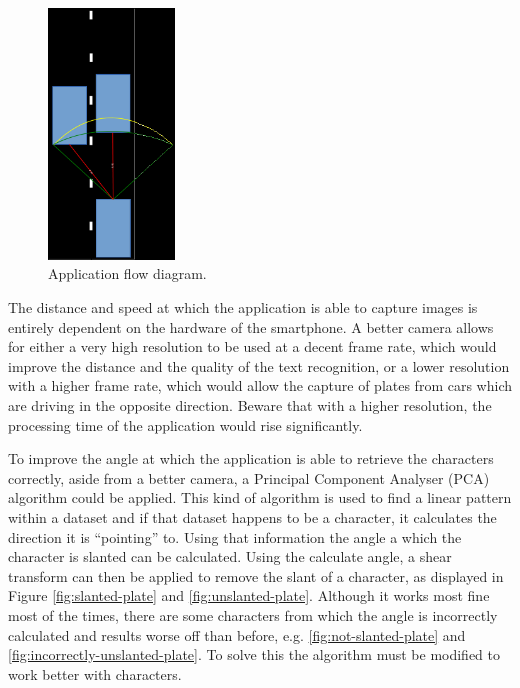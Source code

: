 \begin{figure}[ht]
    \centering
    \includegraphics[width=0.3\textwidth]{plaatjes/roadeye-road}
    \caption{Application flow diagram.}
    \label{fig:road-situation}
\end{figure}%




The distance and speed at which the application is able to capture images is entirely dependent on the hardware of the smartphone. A better camera allows for either a very high resolution to be used at a decent frame rate, which would improve the distance and the quality of the text recognition, or a lower resolution with a higher frame rate, which would allow the capture of plates from cars which are driving in the opposite direction. Beware that with a higher resolution, the processing time of the application would rise significantly.


To improve the angle at which the application is able to retrieve the characters correctly, aside from a better camera, a Principal Component Analyser (PCA) algorithm could be applied. This kind of algorithm is used to find a linear pattern within a dataset and if that dataset happens to be a character, it calculates the direction it is ``pointing'' to. Using that information the angle a which the character is slanted can be calculated. Using the calculate angle, a shear transform can then be applied to remove the slant of a character, as displayed in Figure \ref{fig:slanted-plate} and \ref{fig:unslanted-plate}. Although it works most fine most of the times, there are some characters from which the angle is incorrectly calculated and results worse off than before, e.g. \ref{fig:not-slanted-plate} and \ref{fig:incorrectly-unslanted-plate}. To solve this the algorithm must be modified to work better with characters.

